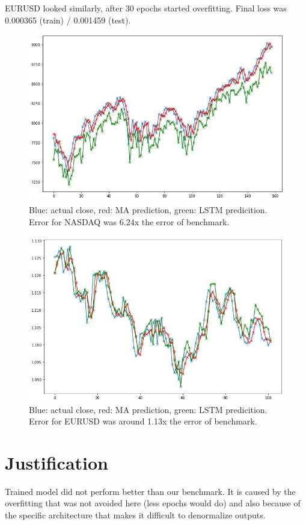 \documentclass[a4paper,12pt]{article}
\begin{document}
EURUSD looked similarly, after 30 epochs started overfitting. Final loss was 0.000365 (train) / 0.001459 (test).

\begin{figure}[h]
	\centering
	\includegraphics[scale=2.1]{nasdaqVs}
	\caption{Blue: actual close, red: MA prediction, green: LSTM predicition. Error for NASDAQ was 6.24x the error of benchmark.}
\end{figure}

\begin{figure}[h]
	\centering
	\includegraphics[scale=2.1]{eurusdVs}
	\caption{Blue: actual close, red: MA prediction, green: LSTM predicition. Error for EURUSD was around 1.13x the error of benchmark.}
\end{figure}

\section{Justification}
Trained model did not perform better than our benchmark. It is caused by the overfitting that was not avoided here (less epochs would do) and also because of the specific architecture that makes it difficult to denormalize outputs.
\end{document}
